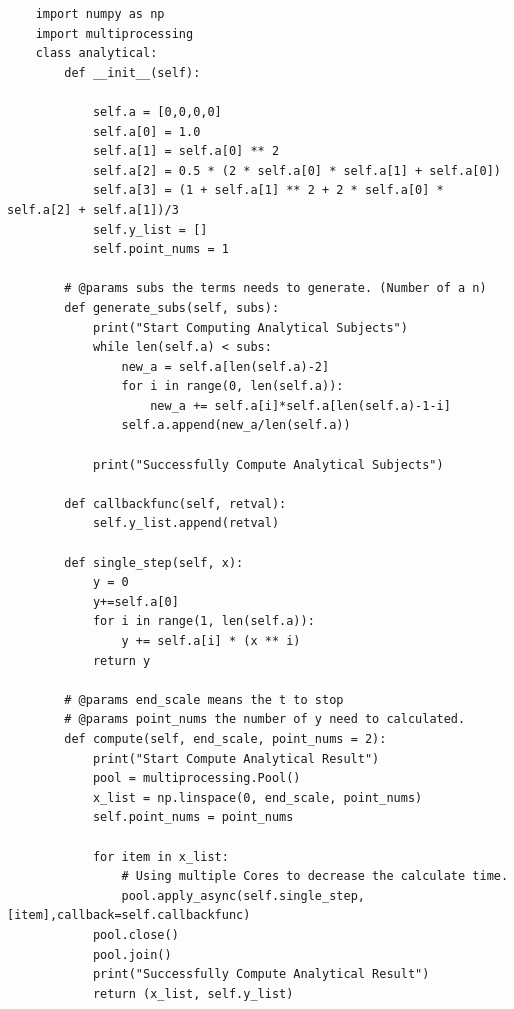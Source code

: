 \documentclass[11pt,a4paper]{article}
\begin{document}
\begin{lstlisting}
	import numpy as np
	import multiprocessing
	class analytical:
		def __init__(self):

			self.a = [0,0,0,0]
			self.a[0] = 1.0
			self.a[1] = self.a[0] ** 2
			self.a[2] = 0.5 * (2 * self.a[0] * self.a[1] + self.a[0])
			self.a[3] = (1 + self.a[1] ** 2 + 2 * self.a[0] * self.a[2] + self.a[1])/3
			self.y_list = []
			self.point_nums = 1

		# @params subs the terms needs to generate. (Number of a n)
		def generate_subs(self, subs):
			print("Start Computing Analytical Subjects")
			while len(self.a) < subs:
				new_a = self.a[len(self.a)-2]
				for i in range(0, len(self.a)):
					new_a += self.a[i]*self.a[len(self.a)-1-i]
				self.a.append(new_a/len(self.a))

			print("Successfully Compute Analytical Subjects")

		def callbackfunc(self, retval):
			self.y_list.append(retval)

		def single_step(self, x):
			y = 0
			y+=self.a[0]
			for i in range(1, len(self.a)):
				y += self.a[i] * (x ** i)
			return y

		# @params end_scale means the t to stop
		# @params point_nums the number of y need to calculated.
		def compute(self, end_scale, point_nums = 2):
			print("Start Compute Analytical Result")
			pool = multiprocessing.Pool()
			x_list = np.linspace(0, end_scale, point_nums)
			self.point_nums = point_nums

			for item in x_list:
				# Using multiple Cores to decrease the calculate time.
				pool.apply_async(self.single_step,[item],callback=self.callbackfunc) 
			pool.close()
			pool.join()
			print("Successfully Compute Analytical Result")
			return (x_list, self.y_list)
\end{lstlisting}
\end{document}

